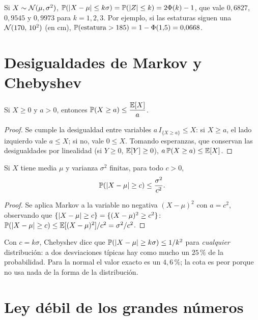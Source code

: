 \begin{ejemplo}[Regla 68--95--99,7]\label{ej:t6-regla}
Si $X\sim\mathcal{N}(\mu,\sigma^{2})$, $\mathbb{P}(\lvert X-\mu\rvert\le k\sigma)=\mathbb{P}(\lvert Z\rvert\le k)=2\Phi(k)-1$, que vale $0{,}6827$, $0{,}9545$ y $0{,}9973$ para $k=1,2,3$. Por ejemplo, si las estaturas siguen una $\mathcal{N}(170,\,10^{2})$ (en cm), $\mathbb{P}(\text{estatura}>185)=1-\Phi(1{,}5)=0{,}0668$.
\end{ejemplo}

\section{Desigualdades de Markov y Chebyshev}

\begin{teorema}\label{teo:t6-markov}
Si $X\ge0$ y $a>0$, entonces $\mathbb{P}(X\ge a)\le\dfrac{\mathbb{E}[X]}{a}$.
\end{teorema}

\begin{proof}
Se cumple la desigualdad entre variables $a\,I_{\{X\ge a\}}\le X$: si $X\ge a$, el lado izquierdo vale $a\le X$; si no, vale $0\le X$. Tomando esperanzas, que conservan las desigualdades por linealidad (si $Y\ge0$, $\mathbb{E}[Y]\ge0$), $a\,\mathbb{P}(X\ge a)\le\mathbb{E}[X]$.
\end{proof}

\begin{teorema}\label{teo:t6-chebyshev}
Si $X$ tiene media $\mu$ y varianza $\sigma^{2}$ finitas, para todo $c>0$,
\[
\mathbb{P}(\lvert X-\mu\rvert\ge c)\le\frac{\sigma^{2}}{c^{2}}.
\]
\end{teorema}

\begin{proof}
Se aplica Markov a la variable no negativa $(X-\mu)^{2}$ con $a=c^{2}$, observando que $\{\lvert X-\mu\rvert\ge c\}=\{(X-\mu)^{2}\ge c^{2}\}$: $\mathbb{P}(\lvert X-\mu\rvert\ge c)\le\mathbb{E}[(X-\mu)^{2}]/c^{2}=\sigma^{2}/c^{2}$.
\end{proof}

Con $c=k\sigma$, Chebyshev dice que $\mathbb{P}(\lvert X-\mu\rvert\ge k\sigma)\le1/k^{2}$ para \emph{cualquier} distribución: a dos desviaciones típicas hay como mucho un $25\,\%$ de la probabilidad. Para la normal el valor exacto es un $4{,}6\,\%$; la cota es peor porque no usa nada de la forma de la distribución.

\section{Ley débil de los grandes números}

